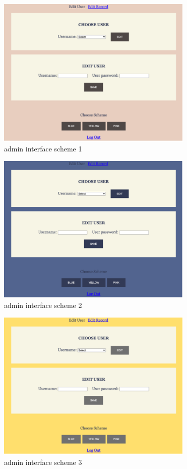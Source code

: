 \documentclass[12pt, letterpaper]{article}
\begin{document}
 \begin{figure}[htbp]
	\centering
	\includegraphics[width=3.7in]{images/q14_4.png}
	\caption{admin interface scheme 1}
 \end{figure}
 
 \begin{figure}[htbp]
	\centering
	\includegraphics[width=3.7in]{images/q14_5.png}
	\caption{admin interface scheme 2}
 \end{figure}
 
 \newpage

\begin{figure}[htbp]
	\centering
	\includegraphics[width=3.7in]{images/q14_6.png}
	\caption{admin interface scheme 3}
 \end{figure}
 \newpage
\end{document}
